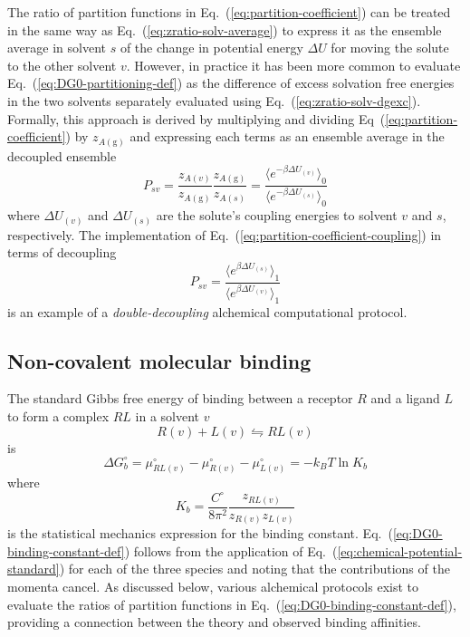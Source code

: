 \documentclass[9pt,bestpractices]{livecoms}
\begin{document}
The ratio of partition functions in Eq.~(\ref{eq:partition-coefficient}) can be treated in the same way as Eq.~(\ref{eq:zratio-solv-average}) to express it as the ensemble average in solvent $s$ of the change in potential energy $\Delta U$ for moving the solute to the other solvent $v$. However, in practice it has been more common to evaluate Eq.~(\ref{eq:DG0-partitioning-def}) as the difference of excess solvation free energies in the two solvents separately evaluated using Eq.~(\ref{eq:zratio-solv-dgexc}).~\cite{bosisio2016blinded} Formally, this approach is derived by multiplying and dividing Eq~(\ref{eq:partition-coefficient}) by $z_{A(\mathrm{g})}$ and expressing each terms as an ensemble average in the decoupled ensemble
\begin{equation}
  P_{sv} = \frac{z_{A(v)}}{z_{A(\mathrm{g})}}  \frac{z_{A(\mathrm{g})}}{z_{A(s)}} = \frac{\langle e^{-\beta \Delta U_{(v)}} \rangle_0}{\langle e^{-\beta \Delta U_{(s)} } \rangle_0 }
  \label{eq:partition-coefficient-coupling}
\end{equation}
where $\Delta U_{(v)}$ and $\Delta U_{(s)}$ are the solute's coupling energies to solvent $v$ and $s$, respectively. 
The implementation of Eq.~(\ref{eq:partition-coefficient-coupling}) in terms of decoupling
\begin{equation}
P_{sv} = \frac{\langle e^{\beta \Delta U_{(s)}} \rangle_1}{\langle e^{\beta \Delta U_{(v)} } \rangle_1 }
\label{eq:partition-coefficient-decoupling}
\end{equation}
is an example of a \emph{double-decoupling} alchemical computational protocol.~\cite{hermans1986freeenergy,gilson1997statisticalthermodynamic}

\subsection{Non-covalent molecular binding}
\label{sec:non-covalent-molecular-binding}

The standard Gibbs free energy of binding between a receptor $R$ and a ligand $L$ to form a complex $RL$ in a solvent $v$
\begin{equation}
  R(v) + L(v)  \leftrightharpoons RL(v)
  \label{eq:binding-reaction}
\end{equation}
is
\begin{equation}
  \Delta G^\circ_{b} = \mu^\circ_{RL(v)}  - \mu^\circ_{R(v)} - \mu^\circ_{L(v)} = -k_B T \ln K_b 
  \label{eq:DG0-binding-def}
\end{equation}
where~\cite{gilson1997statisticalthermodynamic,gilson2007calculation}
\begin{equation}
  K_b = \frac{C^\circ}{8 \pi^2} \frac{z_{RL(v)}}{z_{R(v)} z_{L(v)}}
  \label{eq:DG0-binding-constant-def}
\end{equation}
is the statistical mechanics expression for the binding constant. Eq.~(\ref{eq:DG0-binding-constant-def}) follows from the application of  Eq.~(\ref{eq:chemical-potential-standard}) for each of the three species and noting that the contributions of the momenta cancel. As discussed below, various alchemical protocols exist to evaluate the ratios of partition functions in Eq.~(\ref{eq:DG0-binding-constant-def}), providing a connection between the theory and observed binding affinities.
\end{document}
